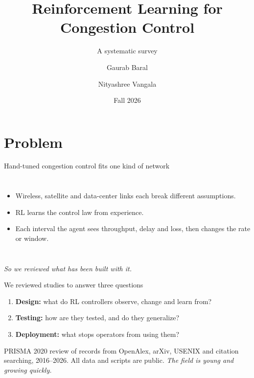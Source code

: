 \documentclass[aspectratio=169,12pt]{beamer}
\title{Reinforcement Learning for Congestion Control}
\subtitle{A systematic survey}
\author{Gaurab Baral \and Nityashree Vangala}
\institute{CS 6043: Networking}
\date{Fall 2026}
\newcommand{\bridge}[1]{\vfill{\small\color{accent}\textit{#1}}\vskip2pt}
\begin{document}
\begin{frame}[plain]
\titlepage
\end{frame}

\section{Problem}

\begin{frame}{Hand-tuned congestion control fits one kind of network}
\begin{columns}[c]
\begin{itemize}\setlength\itemsep{3mm}
  \item Wireless, satellite and data-center links each break different assumptions.
  \item RL learns the control law from experience.
  \item Each interval the agent sees throughput, delay and loss, then changes the rate or window.
\end{itemize}
\centering
{}
\end{columns}
\bridge{So we reviewed what has been built with it.}
\end{frame}

\begin{frame}{We reviewed \nStudies{} studies to answer three questions}
\begin{enumerate}\setlength\itemsep{4mm}
  \item \textbf{Design:} what do RL controllers observe, change and learn from?
  \item \textbf{Testing:} how are they tested, and do they generalize?
  \item \textbf{Deployment:} what stops operators from using them?
\end{enumerate}
\vspace{6mm}
{\small\color{muted} PRISMA 2020 review of \nIdentifiedTotal{} records from OpenAlex, arXiv, USENIX and citation searching, 2016--2026. All data and scripts are public.}
\bridge{The field is young and growing quickly.}
\end{frame}
\end{document}
